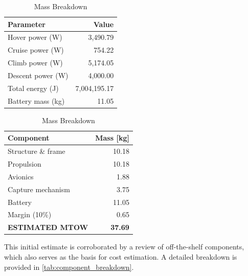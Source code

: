 \begin{table}[H]
    \centering
    \begin{minipage}{0.48\textwidth}
        \centering
        \caption{Power and Energy Requirements}
        \label{tab:lift_cruise_power}
        \small
        \begin{tabular}{lr}
            \toprule
            \textbf{Parameter} & \textbf{Value} \\
            \midrule
            Hover power (W)    & 3,490.79 \\
            Cruise power (W)   & 754.22   \\
            Climb power (W)    & 5,174.05 \\
            Descent power (W)  & 4,000.00 \\
            \midrule
            Total energy (J)   & 7,004,195.17 \\
            Battery mass (kg)  & 11.05    \\
            \bottomrule
        \end{tabular}
    \end{minipage}
    \hfill 
    \begin{minipage}{0.48\textwidth}
        \centering
        \caption{Mass Breakdown}
        \label{tab:lift_cruise_weight}
        \small
        \begin{tabular}{lr}
            \toprule
            \textbf{Component} & \textbf{Mass [kg]} \\
            \midrule
            Structure \& frame  & 10.18 \\
            Propulsion          & 10.18 \\
            Avionics            & 1.88  \\
            Capture mechanism    & 3.75  \\
            Battery             & 11.05 \\
            Margin (10\%)       & 0.65  \\
            \midrule
            \textbf{ESTIMATED MTOW} & \textbf{37.69} \\
            \bottomrule
        \end{tabular}
    \end{minipage}
\end{table}

This initial estimate is corroborated by a review of off-the-shelf components, which also serves as the basis for cost estimation. A detailed breakdown is provided in \autoref{tab:component_breakdown}.


